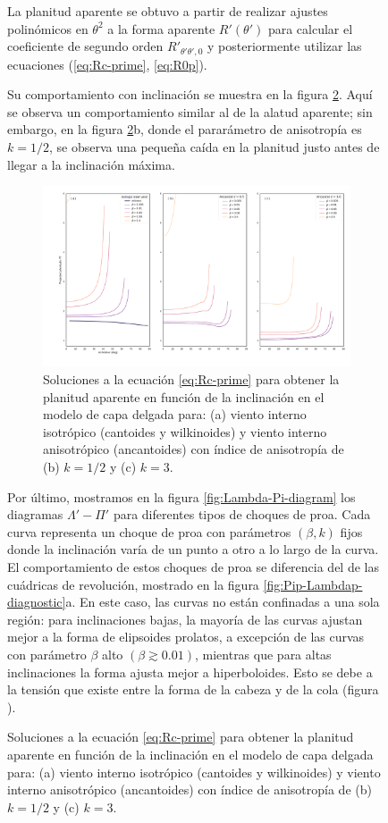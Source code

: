 \begin{figure}
La planitud aparente se obtuvo a partir de realizar ajustes polinómicos en $\theta^2$ a la forma aparente $R'(\theta')$ para calcular el coeficiente de segundo orden $R'_{\theta'\theta', 0}$ y posteriormente utilizar las ecuaciones (\ref{eq:Rc-prime}, \ref{eq:R0p}). 

Su comportamiento con inclinación se muestra en la figura \ref{fig:Pi-vs-inclination}. Aquí se observa un comportamiento similar al de la alatud aparente; sin embargo, en la figura \ref{fig:Pi-vs-inclination}b, donde el pararámetro de anisotropía es $k=1/2$, se observa una pequeña caída en la planitud justo antes de llegar a la inclinación máxima. 

\begin{figure}
  \includegraphics[width=\linewidth]{./Figures/Pi-vs-i}
  \caption{Soluciones a la ecuación \ref{eq:Rc-prime} para obtener la planitud aparente en función de la inclinación en el modelo de capa delgada para: (a) viento interno isotrópico (cantoides y wilkinoides) y viento interno anisotrópico (ancantoides) con índice de anisotropía de (b) $k=1/2$ y (c) $k=3$.}
  \label{fig:Pi-vs-inclination}
\end{figure}

Por último, mostramos en la figura \ref{fig:Lambda-Pi-diagram} los diagramas $\Lambda'-\Pi'$ para diferentes tipos de choques de proa. Cada curva representa un choque de proa con parámetros $(\beta, k)$ fijos donde la inclinación varía de un punto a otro a lo largo de la curva. El comportamiento de estos choques de proa se diferencia del de las cuádricas de revolución, mostrado en la figura \ref{fig:Pip-Lambdap-diagnostic}a. En este caso, las curvas no están confinadas a una sola región: para inclinaciones bajas, la mayoría de las curvas ajustan mejor a la forma de elipsoides prolatos, a excepción de las curvas con parámetro $\beta$ alto $(\beta \gtrsim 0.01)$, mientras que para altas inclinaciones la forma ajusta mejor a hiperboloides. Esto se debe a la tensión que existe entre la forma de la cabeza y de la cola (figura ).


\end{figure}
